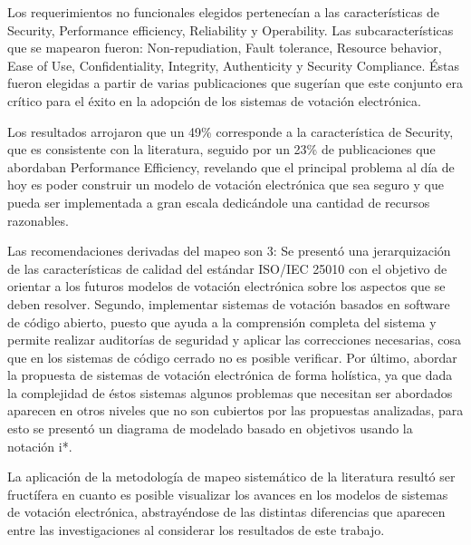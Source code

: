 Los requerimientos no funcionales elegidos pertenecían a las características de Security, Performance efficiency,
Reliability y Operability. Las subcaracterísticas que se mapearon fueron: Non-repudiation, Fault tolerance,
Resource behavior, Ease of Use, Confidentiality, Integrity, Authenticity y Security Compliance. Éstas fueron elegidas
a partir de varias publicaciones que sugerían que este conjunto era crítico para el éxito en la adopción
de los sistemas de votación electrónica.

Los resultados arrojaron que un 49\% corresponde a la característica de Security, que es consistente con
la literatura, seguido por un 23\% de publicaciones que abordaban Performance Efficiency, revelando que
el principal problema al día de hoy es poder construir un modelo de votación electrónica que sea seguro y
que pueda ser implementada a gran escala dedicándole una cantidad de recursos razonables.

Las recomendaciones derivadas del mapeo son 3: Se presentó una jerarquización de las características
de calidad del estándar ISO/IEC 25010 con el objetivo de orientar a los futuros modelos 
de votación electrónica sobre los aspectos que se deben resolver. Segundo, implementar sistemas de votación basados en software 
de código abierto, puesto que ayuda a la comprensión completa del sistema y permite realizar auditorías de 
seguridad y aplicar las correcciones necesarias, cosa que en los sistemas de código cerrado no es posible 
verificar. Por último, abordar la propuesta de sistemas de votación electrónica de
forma holística, ya que dada la complejidad de éstos sistemas algunos problemas que necesitan ser abordados
aparecen en otros niveles que no son cubiertos por las propuestas analizadas, para esto se presentó
un diagrama de modelado basado en objetivos usando la notación i*.  

La aplicación de la metodología de mapeo sistemático de la literatura resultó ser fructífera en cuanto
es posible visualizar los avances en los modelos de sistemas de votación electrónica, abstrayéndose de 
las distintas diferencias que aparecen entre las investigaciones al considerar los resultados de este trabajo.






